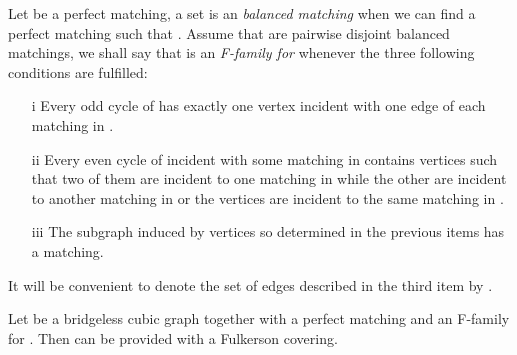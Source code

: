 \documentclass{amsart}
\theoremstyle{definition}
\theoremstyle{remark}
\begin{document}
Let  be a perfect matching, a set  is an {\em
balanced matching} when we can find a perfect matching 
 such that . Assume that   are 
 pairwise disjoint balanced matchings, we shall say that
  is an {\em F-family for } whenever the three following
 conditions are fulfilled:

 \begin{itemize}
   \item [i \label{Item:1}] Every odd cycle of  has exactly one
vertex
   incident with one edge of each matching in .
   \item [ii \label{Item:2}] Every even cycle of  incident with
some matching in    contains  vertices such that
   two of them are incident to one matching in  while the other are
incident to another matching in  or the  vertices are incident to the same matching in 
   .
   \item [ iii \label{Item:3}] The subgraph induced by  vertices so determined in the previous
items has a matching.
 \end{itemize}
It will be convenient to denote the set of edges described in the
third item by .
\begin{thm} \label{Theorem:TechnicalTool}  Let  be a bridgeless cubic graph
together with
a perfect matching  and an F-family for  . Then 
can be provided with a Fulkerson covering.
\end{thm}
\end{document}
